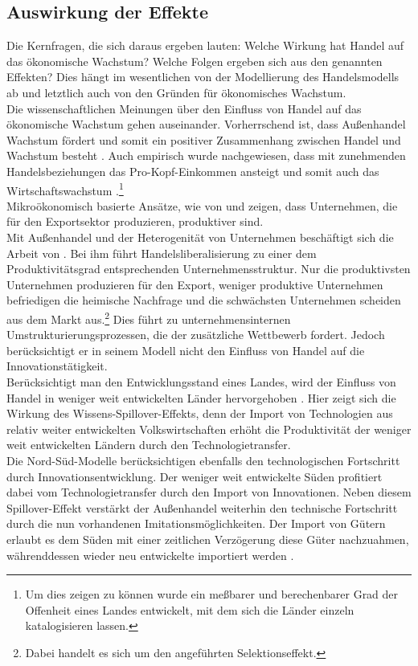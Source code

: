 \subsection{Auswirkung der Effekte}
Die Kernfragen, die sich daraus ergeben lauten:  Welche Wirkung hat Handel auf das ökonomische Wachstum? Welche Folgen ergeben sich aus den genannten Effekten? Dies hängt im wesentlichen von der Modellierung des Handelsmodells ab und letztlich auch von den Gründen für ökonomisches Wachstum.\\
%
Die wissenschaftlichen Meinungen über den Einfluss von Handel auf das ökonomische Wachstum gehen auseinander. Vorherrschend ist, dass Außenhandel Wachstum fördert und somit ein positiver Zusammenhang zwischen Handel und Wachstum besteht \cite{Dollar.1992,Sachs.1995}. Auch empirisch wurde nachgewiesen, dass mit zunehmenden Handelsbeziehungen das Pro-Kopf-Einkommen ansteigt und somit auch das Wirtschaftswachstum \cite{Frankel.1999}.\footnote{Um dies zeigen zu können wurde ein meßbarer und berechenbarer Grad der Offenheit eines Landes entwickelt, mit dem sich die Länder einzeln katalogisieren lassen.}\\
%
Mikroökonomisch basierte Ansätze, wie von \cite{Bernard.2003} und \cite{Bernard.2004} zeigen, dass Unternehmen, die für den Exportsektor produzieren, produktiver sind. \\
Mit Außenhandel und der Heterogenität von Unternehmen beschäftigt sich die Arbeit von \cite{Melitz.2003}. Bei ihm führt Handelsliberalisierung zu einer dem Produktivitätsgrad entsprechenden Unternehmensstruktur. Nur die produktivsten Unternehmen produzieren für den Export, weniger produktive Unternehmen befriedigen die heimische Nachfrage und die schwächsten Unternehmen scheiden aus dem Markt aus.\footnote{Dabei handelt es sich um den angeführten Selektionseffekt.} Dies führt zu unternehmensinternen Umstrukturierungsprozessen, die der zusätzliche Wettbewerb fordert. Jedoch berücksichtigt er in seinem Modell nicht den Einfluss von Handel auf die Innovationstätigkeit.\\
%
Berücksichtigt man den Entwicklungsstand eines Landes, wird der Einfluss von Handel in weniger weit entwickelten Länder hervorgehoben \cite{Pavcnik.2002}. Hier zeigt sich die Wirkung des Wissens-Spillover-Effekts, denn der Import von Technologien aus relativ weiter entwickelten Volkswirtschaften erhöht die Produktivität der weniger weit entwickelten Ländern durch den Technologietransfer. \\
%
Die Nord-Süd-Modelle berücksichtigen ebenfalls den technologischen Fortschritt durch Innovationsentwicklung. Der weniger weit entwickelte Süden profitiert dabei vom Technologietransfer durch den Import von Innovationen. Neben diesem Spillover-Effekt verstärkt der Außenhandel weiterhin den technische Fortschritt durch die nun vorhandenen Imitationsmöglichkeiten. Der Import von Gütern erlaubt es dem Süden mit einer zeitlichen Verzögerung diese Güter nachzuahmen, währenddessen wieder neu entwickelte importiert werden \cite{Grossman.1991a,Krugman.1990}.\\
